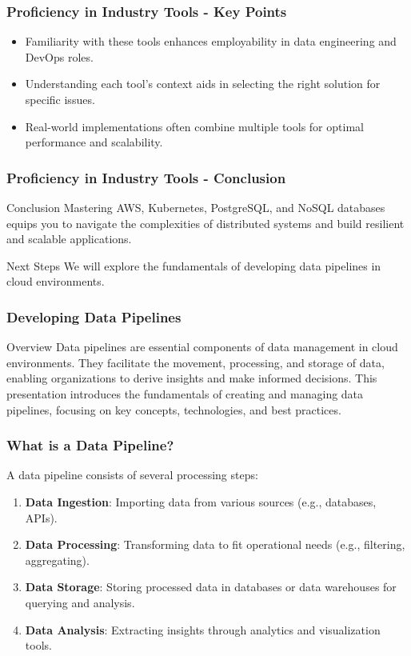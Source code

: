 \documentclass[aspectratio=169]{beamer}
\begin{document}
\begin{frame}
    \frametitle{Proficiency in Industry Tools - Key Points}
    \begin{itemize}
        \item Familiarity with these tools enhances employability in data engineering and DevOps roles.
        \item Understanding each tool's context aids in selecting the right solution for specific issues.
        \item Real-world implementations often combine multiple tools for optimal performance and scalability.
    \end{itemize}
\end{frame}

\begin{frame}
    \frametitle{Proficiency in Industry Tools - Conclusion}
    \begin{block}{Conclusion}
        Mastering AWS, Kubernetes, PostgreSQL, and NoSQL databases equips you to navigate the complexities of distributed systems and build resilient and scalable applications.
    \end{block}
    \begin{block}{Next Steps}
        We will explore the fundamentals of developing data pipelines in cloud environments.
    \end{block}
\end{frame}

\begin{frame}[fragile]
    \frametitle{Developing Data Pipelines}
    \begin{block}{Overview}
        Data pipelines are essential components of data management in cloud environments. 
        They facilitate the movement, processing, and storage of data, enabling organizations to derive insights and make informed decisions. 
        This presentation introduces the fundamentals of creating and managing data pipelines, focusing on key concepts, technologies, and best practices.
    \end{block}
\end{frame}

\begin{frame}[fragile]
    \frametitle{What is a Data Pipeline?}
    A data pipeline consists of several processing steps:
    \begin{enumerate}
        \item \textbf{Data Ingestion}: Importing data from various sources (e.g., databases, APIs).
        \item \textbf{Data Processing}: Transforming data to fit operational needs (e.g., filtering, aggregating).
        \item \textbf{Data Storage}: Storing processed data in databases or data warehouses for querying and analysis.
        \item \textbf{Data Analysis}: Extracting insights through analytics and visualization tools.
    \end{enumerate}
\end{frame}
\end{document}
